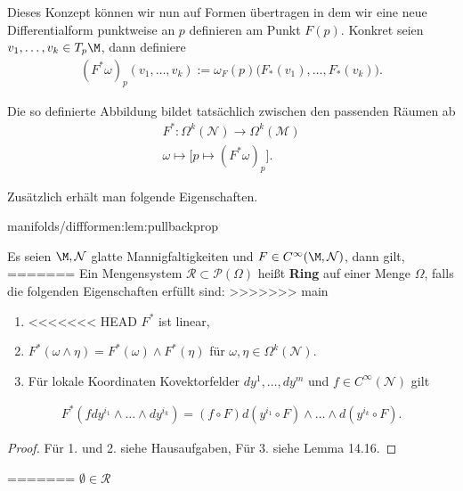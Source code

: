\documentclass[letterpaper,10pt,english]{jupyterBook}
\begin{document}
\par
Dieses Konzept können wir nun auf Formen übertragen in dem wir eine neue Differentialform punktweise an \(p\) definieren am Punkt \(F(p)\). Konkret seien \(v_1,\ldots, v_k\in T_p\M\), dann definiere
\begin{align*}
(F^\ast\omega)_p (v_1,\ldots,v_k) := \omega_F(p)\big(F_\ast(v_1),\ldots,F_\ast(v_k)\big).
\end{align*}
\par
Die so definierte Abbildung bildet tatsächlich zwischen den passenden Räumen ab
\begin{align*}
F^\ast:\Omega^k(\mathcal{N})\to\Omega^k(\mathcal{M})\\
\omega\mapsto \big[ p\mapsto (F^\ast\omega)_p \big].
\end{align*}
\par
Zusätzlich erhält man folgende Eigenschaften.
\begin{lemma}{}{manifolds/diffformen:lem:pullbackprop}



\par
Es seien \(\M,\mathcal{N}\) glatte Mannigfaltigkeiten und \(F\in C^\infty(\M,\mathcal{N})\), dann gilt,
=======
Ein Mengensystem \(\mathcal{R} \subset \mathcal{P}(\Omega)\) heißt \textbf{Ring} auf einer Menge \(\Omega\), falls die folgenden Eigenschaften erfüllt sind:
>>>>>>> main
\begin{enumerate}

\item {} 
\par
<<<<<<< HEAD
\(F^\ast\) ist linear,

\item {} 
\par
\(F^\ast(\omega\wedge\eta) = F^\ast(\omega) \wedge F^\ast(\eta)\) für \(\omega,\eta\in\Omega^k(\mathcal{N})\).

\item {} 
\par
Für lokale Koordinaten Kovektorfelder \(dy^1,\ldots,dy^m\) und \(f\in C^\infty(\mathcal{N})\) gilt

\end{enumerate}
\begin{align*}
F^\ast(f dy^{i_1}\wedge\ldots\wedge dy^{i_k}) = (f \circ F) d(y^{i_1}\circ F)\wedge\ldots\wedge d(y^{i_k}\circ F).
\end{align*}\end{lemma}

\begin{proof}
 Für 1. und 2. siehe Hausaufgaben, Für 3. siehe \cite{Lee03} Lemma 14.16.
\end{proof}
=======
\(\emptyset \in \mathcal{R}\)
\end{document}
